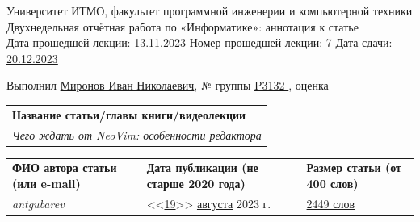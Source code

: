 \documentclass[12pt]{article}
\begin{document}
\begin{center}
\quad Университет ИТМО, факультет программной инженерии и компьютерной техники \\
\quad Двухнедельная отчётная работа по «Информатике»: аннотация к статье\\
\quad Дата прошедшей лекции: \underline{13.11.2023} 	Номер прошедшей лекции: \underline{7}	Дата сдачи: \underline{20.12.2023}

\bigskip

\quad Выполнил \underline{Миронов Иван Николаевич}, № группы \underline{ P3132 }, оценка \underline{\hspace{2cm}}


\end{center}

\begin{tabularx}{\textwidth} { 
  | >{\raggedright\arraybackslash}X|}
    \hline
\textbf{Название статьи/главы книги/видеолекции}\\
    \textit{Чего ждать от NeoVim: особенности редактора}\\
    \hline
\end{tabularx}

\begin{tabularx}{\textwidth} 
{ 
| >{\centering\arraybackslash}X
| >{\centering\arraybackslash}X
| >{\centering\arraybackslash}X 
|}
    \textbf{ФИО автора статьи \quad (или e-mail)} & \textbf{Дата публикации \qquad\qquad (не старше 2020 года)} & \textbf{Размер статьи \qquad\qquad (от 400 слов)} \\
     \textit{antgubarev} & <<\underline{19}>> \underline{августа} 2023 г. & \underline{2449 слов} \\
    \hline
\end{tabularx}
\end{document}
